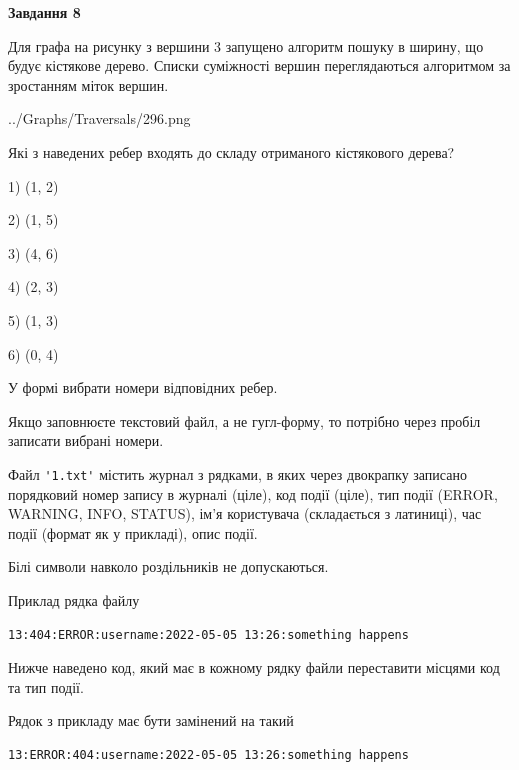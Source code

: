 \documentclass[12pt, ukrainian]{article}
\def\code#1{\Verb!#1!}
\begin{document}
{\begin {large}
{\begin {center}\textbf{Завдання 8}\end {center}}\par
Для графа на рисунку з вершини 3 запущено алгоритм пошуку в ширину, що будує кістякове дерево. Списки суміжності вершин переглядаються алгоритмом за зростанням міток вершин.\par
\begin{center}
	{../Graphs/Traversals/296.png}
\end{center}
\par Які з наведених ребер входять до складу отриманого кістякового дерева?\par
1) (1, 2)\par
2) (1, 5)\par
3) (4, 6)\par
4) (2, 3)\par
5) (1, 3)\par
6) (0, 4)\par
{\vskip 15pt} У формі вибрати номери відповідних ребер.


Якщо заповнюєте текстовий файл, а не гугл-форму, то потрібно через пробіл записа\-ти вибрані номери.\par
\newpage


Файл \code{'1.txt'} містить журнал з рядками, в яких через двокрапку записано поряд\-ко\-вий номер запису в журналі (ціле), код події (ціле), тип події (ERROR,\\ WARNING, INFO, STATUS), ім'я користувача (складається з латиниці), час події (фор\-мат як у прикладі), опис події.

Білі символи навколо роздільників не допускаються.

Приклад рядка файлу



\begin{verbatim}
13:404:ERROR:username:2022-05-05 13:26:something happens
\end{verbatim}


Нижче наведено код, який має в кожному рядку файли переставити місцями код та тип події.

Рядок з прикладу має бути замінений на такий



\begin{verbatim}
13:ERROR:404:username:2022-05-05 13:26:something happens
\end{verbatim}





\end{large}}
\end{document}
